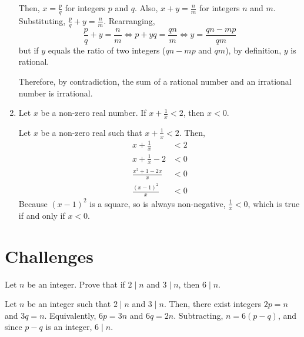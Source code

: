 \begin{enumerate}
\begin{prf}
          Then, $x = \frac{p}{q}$ for integers $p$ and $q$.
          Also, $x+y = \frac{n}{m}$ for integers $n$ and $m$.
          Substituting, $\frac{p}{q} + y = \frac{n}{m}$.
          Rearranging,
          \begin{equation*}
            \frac{p}{q} + y = \frac{n}{m}        \iff
            p+yq            = \frac{qn}{m}       \iff
            y               = \frac{qn - mp}{qm}
          \end{equation*}
          but if $y$ equals the ratio of two integers ($qn-mp$ and $qm$), by definition, $y$ is rational.

          Therefore, by contradiction, the sum of a rational number and an irrational number is irrational.
        \end{prf}

  \item Let $x$ be a non-zero real number. If $x + \frac{1}{x} < 2$, then $x < 0$.
        \begin{prf}
          Let $x$ be a non-zero real such that $x + \frac{1}{x} < 2$. Then,
          \begin{align*}
            x + \frac{1}{x}        & < 2 \\
            x + \frac{1}{x} - 2    & < 0 \\
            \frac{x^2 + 1 - 2x}{x} & < 0 \\
            \frac{(x-1)^2}{x}      & < 0
          \end{align*}
          Because $(x-1)^2$ is a square, so is always non-negative, $\frac{1}{x} < 0$, which is true if and only if $x < 0$.
        \end{prf}
\end{enumerate}


\section{Challenges}
\begin{challenge}
  Let $n$ be an integer.
  Prove that if $2 \mid n$ and $3 \mid n$, then $6 \mid n$.
\end{challenge}
\begin{prf}
  Let $n$ be an integer such that $2 \mid n$ and $3 \mid n$.
  Then, there exist integers $2p = n$ and $3q = n$.
  Equivalently, $6p = 3n$ and $6q = 2n$.
  Subtracting, $n = 6(p-q)$, and since $p-q$ is an integer, $6 \mid n$.
\end{prf}

